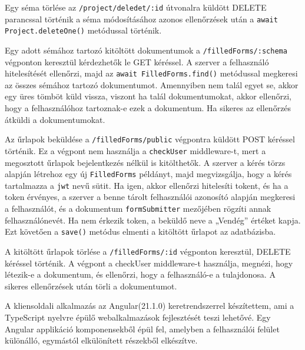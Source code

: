 
Egy séma törlése az \texttt{/project/deledet/:id} útvonalra küldött DELETE parancssal történik a séma módosításához azonos ellenőrzések után a \texttt{await Project.deleteOne()} metódussal történik.



Egy adott sémához tartozó kitöltött dokumentumok a \texttt{/filledForms/:schema} végponton keresztül kérdezhetők le GET kéréssel. A szerver a felhasználó hitelesítését ellenőrzi, majd az \texttt{await FilledForms.find()} metódussal megkeresi az összes sémához tartozó dokumentumot. Amennyiben nem talál egyet se, akkor egy üres tömböt küld vissza, viszont ha talál dokumentumokat, akkor ellenőrzi, hogy a felhasználóhoz tartoznak-e ezek a dokumentum. Ha sikeres az ellenőrzés átküldi a dokumentumokat.


Az űrlapok beküldése a \texttt{/filledForms/public} végpontra küldött POST kéréssel történik. Ez a végpont nem használja a \texttt{checkUser} middleware-t, mert a megosztott űrlapok bejelentkezés nélkül is kitölthetők. A szerver a kérés törzs alapján létrehoz egy új \texttt{FilledForms} példányt, majd megvizsgálja, hogy a kérés tartalmazza a \texttt{jwt} nevű sütit. Ha igen, akkor ellenőrzi hitelesíti tokent, és ha a token érvényes, a szerver a benne tárolt felhasználói azonosító alapján megkeresi a felhasználót, és a dokumentum \texttt{formSubmitter} mezőjében rögzíti annak felhasználónevét. Ha nem érkezik token, a beküldő neve a „Vendég” értéket kapja. Ezt követően a \texttt{save()} metódus elmenti a kitöltött űrlapot az adatbázisba.


A kitöltött űrlapok törlése a \texttt{/filledForms/:id} végponton keresztül, DELETE kéréssel történik. A végpont a checkUser middleware-t használja, megnézi, hogy létezik-e a dokumentum, és ellenőrzi, hogy a felhasználó-e a tulajdonosa. A sikeres ellenőrzések után törli a dokumentumot.


A kliensoldali alkalmazás az Angular(21.1.0) keretrendszerrel készítettem, ami a \\ TypeScript nyelvre épülő webalkalmazások fejlesztését teszi lehetővé. Egy Angular applikáció komponensekből épül fel, amelyben a felhasználói felület különálló, egymástól elkülönített részekből elkészítve.

